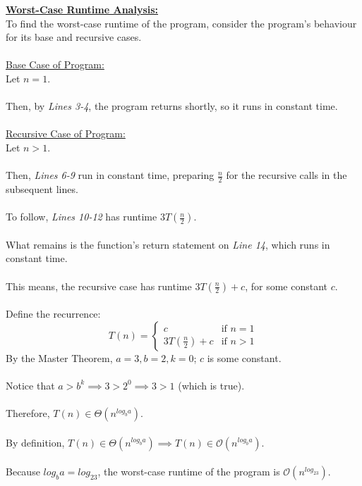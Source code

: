 \documentclass[12pt]{article}
\begin{document}
\textbf{\underline{Worst-Case Runtime Analysis:}} \\
To find the worst-case runtime of the program, consider the program's behaviour for its base and recursive cases. \\
\\
\underline{Base Case of Program:} \\
Let $n = 1$. \\
\\
Then, by \textit{Lines 3-4}, the program returns shortly, so it runs in constant time. \\
\\
\underline{Recursive Case of Program:} \\
Let $n > 1$. \\
\\
Then, \textit{Lines 6-9} run in constant time, preparing $\frac{n}{2}$ for the recursive calls in the subsequent lines. \\
\\
To follow, \textit{Lines 10-12} has runtime $3T(\frac{n}{2})$. \\
\\
What remains is the function's return statement on \textit{Line 14}, which runs in constant time. \\
\\
This means, the recursive case has runtime $3T(\frac{n}{2}) + c$, for some constant $c$. \\
\\
Define the recurrence:
\[
    T(n) =
    \begin{cases}
        c & \text{if } n = 1 \\
        3T(\frac{n}{2}) + c & \text{if } n > 1
    \end{cases}
\]
By the Master Theorem, $a = 3, b = 2, k = 0$; $c$ is some constant. \\
\\
Notice that $a > b^k \implies 3 > 2^0 \implies 3 > 1$ (which is true). \\
\\
Therefore, $T(n) \in \Theta (n^{log_ba})$. \\
\\
By definition, $T(n) \in \Theta (n^{log_ba}) \implies T(n) \in \mathcal{O} (n^{log_ba})$. \\
\\
Because $log_ba = log_23$, the worst-case runtime of the program is $\mathcal{O} (n^{log_23})$. \\
\\
\end{document}
